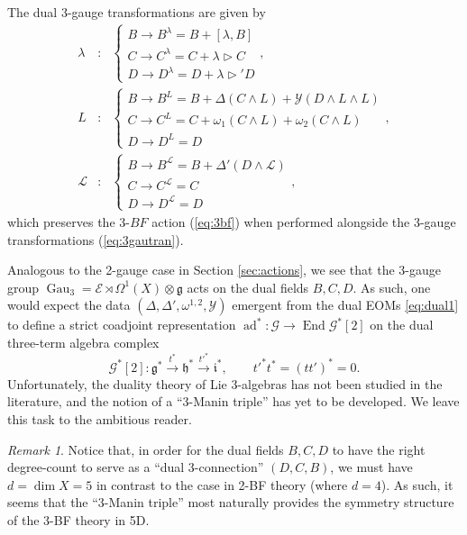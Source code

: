 \documentclass[onecolumn]{article}
\theoremstyle{theorem}
\theoremstyle{remark}
\newtheorem{remark}{Remark}[section]
\theoremstyle{example}
\theoremstyle{definition}
\numberwithin{equation}{section}
\begin{document}
The dual 3-gauge transformations are given by \cite{Radenkovic:2019qme} 
\begin{eqnarray}
    \lambda&:& \begin{cases}B\rightarrow B^\lambda= B+[\lambda,B] \\ C \rightarrow C^\lambda = C + \lambda\rhd C \\ D\rightarrow D^\lambda = D + \lambda\rhd' D\end{cases},\nonumber \\
    L &:& \begin{cases} B\rightarrow B^L =  B + \Delta(C\wedge L) + \mathcal{Y}(D\wedge L\wedge L) \\ C\rightarrow C^L = C + \omega_1(C\wedge L) + \omega_2(C\wedge L) \\ D\rightarrow D^L = D\end{cases},\nonumber \\
    \mathcal{L}&:& \begin{cases} B\rightarrow B^\mathcal{L}= B + \Delta'(D\wedge \mathcal{L}) \\ C\rightarrow C^\mathcal{L} = C \\ D\rightarrow D^\mathcal{L} = D\end{cases}, \label{eq:dual3}
\end{eqnarray}
which preserves the 3-$BF$ action  (\ref{eq:3bf}) when performed alongside the 3-gauge transformations  (\ref{eq:3gautran}). 

Analogous to the 2-gauge case in Section \ref{sec:actions}, we see that the 3-gauge group $\operatorname{Gau}_3=\mathscr{E}\rtimes\Omega^1(X)\otimes\mathfrak{g}$ acts on the dual fields $B,C,D$. As such, one would expect the data $(\Delta,\Delta',\omega^{1,2},\mathcal{Y})$ emergent from the dual EOMs  \eqref{eq:dual1} to define a strict coadjoint representation $\operatorname{ad}^*:\mathscr{G}\rightarrow\operatorname{End}\mathscr{G}^*[2]$ on the dual three-term algebra complex
\begin{equation}
    \mathscr{G}^*[2]: \mathfrak{g}^*\xrightarrow{t^*}\mathfrak{h}^*\xrightarrow{t'^*} \mathfrak{i}^*,\qquad t'^*t^* = (tt')^* = 0.\nonumber
\end{equation}
{Unfortunately}, the duality theory of Lie 3-algebras has not been studied in the literature, and the notion of a ``3-Manin triple'' has yet to be developed. We leave this task to the ambitious reader.

\begin{remark}
Notice that, in order for the dual fields $B,C,D$ to have the right degree-count to serve as a ``dual 3-connection'' $(D,C,B)$, we must have $d=\operatorname{dim}X=5$ in contrast to the case in 2-BF theory (where $d=4$). As such, it seems that the ``3-Manin triple'' most naturally provides the symmetry structure of the 3-BF theory in 5D.
\end{remark}
\end{document}
